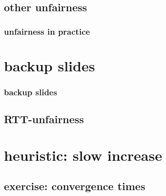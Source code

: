 \subsection{other unfairness}


\subsubsection{unfairness in practice}







\section{backup slides}
\begin{frame}\frametitle{backup slides}
\end{frame}
\subsection{RTT-unfairness}

\section{heuristic: slow increase}


\subsection{exercise: convergence times}







